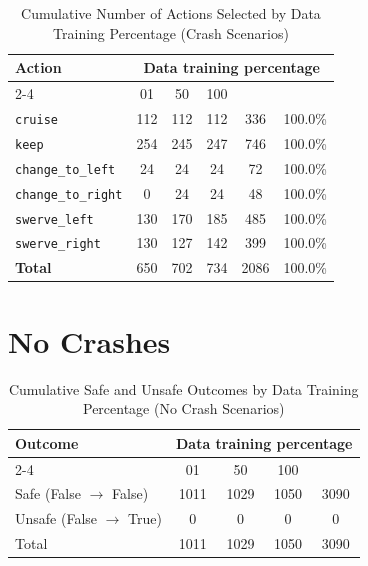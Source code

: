 \documentclass{article}
\begin{document}
\begin{table}[h]
\centering
\caption{Cumulative Number of Actions Selected by Data Training Percentage (Crash Scenarios)}
\begin{tabular}{l|ccc|c|c}
\toprule
\multirow{2}{*}{Action} & \multicolumn{5}{c|}{Data training percentage} & \multirow{2}{*}{Total} & \multirow{2}{*}{Safe (\%)} \\
\cmidrule{2-4}
 & 01 & 50 & 100 & & \\
\midrule
\texttt{cruise} & 112 & 112 & 112 & 336 & 100.0\% \\ 
\texttt{keep} & 254 & 245 & 247 & 746 & 100.0\% \\ 
\texttt{change\_to\_left} & 24 & 24 & 24 & 72 & 100.0\% \\ 
\texttt{change\_to\_right} & 0 & 24 & 24 & 48 & 100.0\% \\ 
\texttt{swerve\_left} & 130 & 170 & 185 & 485 & 100.0\% \\ 
\texttt{swerve\_right} & 130 & 127 & 142 & 399 & 100.0\% \\ 
\midrule
\textbf{Total} & 650 & 702 & 734 & 2086 & 100.0\% \\ 
\bottomrule
\end{tabular}
\end{table}

\pagebreak
\section{No Crashes}

\begin{table}[h]
\centering
\caption{Cumulative Safe and Unsafe Outcomes by Data Training Percentage (No Crash Scenarios)}
\begin{tabular}{l|ccc|c}
\toprule
\multirow{2}{*}{Outcome} & \multicolumn{5}{c|}{Data training percentage} & \multirow{2}{*}{Total} \\
\cmidrule{2-4}
 & 01 & 50  & 100 & \\
\midrule
Safe (False $\rightarrow$ False) & 1011 & 1029 & 1050 & 3090 \\ 
Unsafe (False $\rightarrow$ True) & 0 & 0 & 0 & 0 \\ 
\midrule
Total & 1011 & 1029 & 1050 & 3090 \\ 
\bottomrule
\end{tabular}
\end{table}
\end{document}
